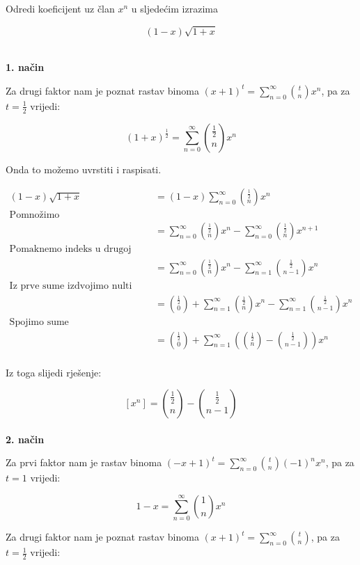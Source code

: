 \documentclass[exam.tex]{subfiles}
\begin{document}
	\begin{subtask}
		Odredi koeficijent uz član \( x^n \) u sljedećim izrazima
	
		\[ (1 - x) \sqrt{1 + x} \] \\
	\end{subtask}
	
	\textbf{1. način}
	
	Za drugi faktor nam je poznat rastav binoma \( (x + 1)^t = \sum\limits^\infty_{n=0} \binom{t}{n} x^n \), pa za \( t = \frac{1}{2} \) vrijedi:
	
	\[ (1 + x)^{\frac{1}{2}} = \sum\limits^\infty_{n=0} \binom{\frac{1}{2}}{n} x^n \]
	
	Onda to možemo uvrstiti i raspisati.
	
	\begin{align*}
		(1 - x) \sqrt{1 + x} &= (1 - x) \sum\limits^\infty_{n=0} \binom{\frac{1}{2}}{n} x^n \\
		\text{Pomnožimo} \\
		&= \sum\limits^\infty_{n=0} \binom{\frac{1}{2}}{n} x^n - \sum\limits^\infty_{n=0} \binom{\frac{1}{2}}{n} x^{n + 1} \\
		\text{Pomaknemo indeks u drugoj sumi} \\
		&= \sum\limits^\infty_{n=0} \binom{\frac{1}{2}}{n} x^n - \sum\limits^\infty_{n=1} \binom{\frac{1}{2}}{n - 1} x^{n} \\
		\text{Iz prve sume izdvojimo nulti element} \\
		&= \binom{\frac{1}{2}}{0} + \sum\limits^\infty_{n=1} \binom{\frac{1}{2}}{n} x^n - \sum\limits^\infty_{n=1} \binom{\frac{1}{2}}{n - 1} x^{n} \\
		\text{Spojimo sume} \\
		&= \binom{\frac{1}{2}}{0} + \sum\limits^\infty_{n=1} \left ( \binom{\frac{1}{2}}{n} -  \binom{\frac{1}{2}}{n - 1} \right ) x^{n} \\
	\end{align*}
	
	Iz toga slijedi rješenje:
	
	\[ [x^n] = \binom{\frac{1}{2}}{n} - \binom{\frac{1}{2}}{n - 1} \] 	\\
	
	\textbf{2. način}
	
	Za prvi faktor nam je rastav binoma \( (-x + 1)^t = \sum\limits^\infty_{n=0} \binom{t}{n} (-1)^n x^n \), pa za \( t = 1 \) vrijedi:
	
	\[ 1 - x = \sum\limits^\infty_{n=0} \binom{1}{n} x^n \]
	
	Za drugi faktor nam je poznat rastav binoma \( (x + 1)^t = \sum\limits^\infty_{n=0} \binom{t}{n} \), pa za \( t = \frac{1}{2} \) vrijedi:
	
\end{document}
